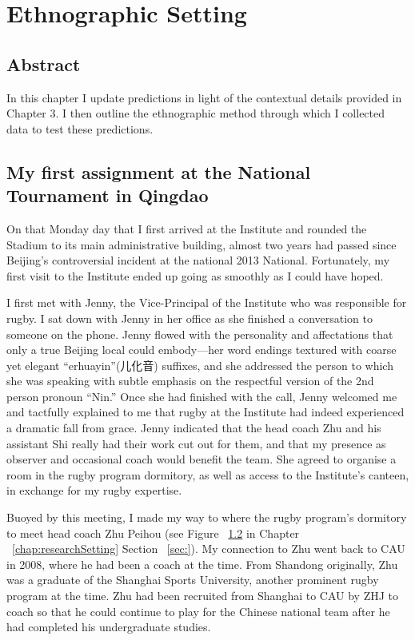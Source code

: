 \chapter{\label{chap:ethnoSetting} Ethnographic Setting}

  \minitoc



\section{Abstract}
In this chapter I update predictions in light of the contextual details provided in Chapter 3.  I then outline the ethnographic method through which I collected data to test these predictions.

                                        \begin{CJK}{UTF8}{gbsn}

\section{My first assignment at the National Tournament in Qingdao \label{sect:qingdaoVignette}}

On that Monday day that I first arrived at the Institute and rounded the Stadium to its main administrative building, almost two years had passed since Beijing's controversial incident at the national 2013 National.  Fortunately, my first visit to the Institute ended up going as smoothly as I could have hoped.

I first met with Jenny, the Vice-Principal of the Institute who was responsible for rugby.  I sat down with Jenny in her office as she finished a conversation to someone on the phone. Jenny flowed with the personality and affectations that only a true Beijing local could embody---her word endings textured with coarse yet elegant ``erhuayin''(儿化音) suffixes, and she addressed the person to which she was speaking with subtle emphasis on the respectful version of the 2nd person pronoun ``Nin.''  Once she had finished with the call, Jenny welcomed me and tactfully explained to me that rugby at the Institute had indeed experienced a dramatic fall from grace.  Jenny indicated that the head coach Zhu and his assistant Shi really had their work cut out for them, and that my presence as observer and occasional coach would benefit the team.  She agreed to organise a room in the rugby program dormitory, as well as access to the Institute's canteen, in exchange for my rugby expertise.

Buoyed by this meeting, I made my way to where the rugby program's dormitory to meet head coach Zhu Peihou (see Figure ~\ref{} in Chapter ~\ref{chap:researchSetting} Section ~\ref{sec:}).  My connection to Zhu went back to CAU in 2008, where he had been a coach at the time.  From Shandong originally, Zhu was a graduate of the Shanghai Sports University, another prominent rugby program at the time.  Zhu had been recruited from Shanghai to CAU by ZHJ to coach so that he could continue to play for the Chinese national team after he had completed his undergraduate studies.


\end{CJK}
